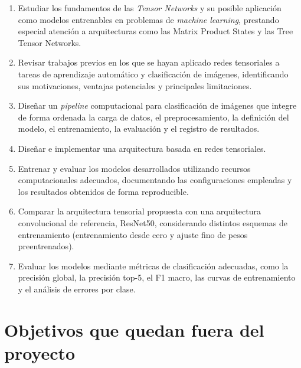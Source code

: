 \begin{enumerate}

	\item Estudiar los fundamentos de las \textit{Tensor Networks} y su posible aplicación como modelos entrenables en problemas de \textit{machine learning}, prestando especial atención a arquitecturas como las Matrix Product States y las Tree Tensor Networks.

    \item Revisar trabajos previos en los que se hayan aplicado redes tensoriales a tareas de aprendizaje automático y clasificación de imágenes, identificando sus motivaciones, ventajas potenciales y principales limitaciones.

    \item Diseñar un \textit{pipeline} computacional para clasificación de imágenes que integre de forma ordenada la carga de datos, el preprocesamiento, la definición del modelo, el entrenamiento, la evaluación y el registro de resultados.

    \item Diseñar e implementar una arquitectura basada en redes tensoriales.

    \item Entrenar y evaluar los modelos desarrollados utilizando recursos computacionales adecuados, documentando las configuraciones empleadas y los resultados obtenidos de forma reproducible.

    \item Comparar la arquitectura tensorial propuesta con una arquitectura convolucional de referencia, ResNet50, considerando distintos esquemas de entrenamiento (entrenamiento desde cero y ajuste fino de pesos preentrenados).

    \item Evaluar los modelos mediante métricas de clasificación adecuadas, como la precisión global, la precisión top-5, el F1 macro, las curvas de entrenamiento y el análisis de errores por clase.
	
\end{enumerate}

\section{Objetivos que quedan fuera del proyecto}

